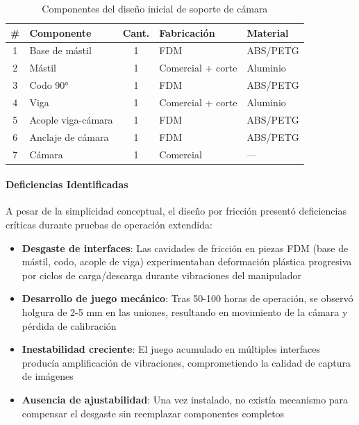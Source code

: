 \begin{table}[H]
\centering
\caption{Componentes del diseño inicial de soporte de cámara}
\label{tab:soporte_camara_v1}
\small
\begin{tabular}{|c|l|c|l|l|}
\hline
\textbf{\#} & \textbf{Componente} & \textbf{Cant.} & \textbf{Fabricación} & \textbf{Material} \\
\hline
1 & Base de mástil & 1 & FDM & ABS/PETG \\
2 & Mástil & 1 & Comercial + corte & Aluminio \\
3 & Codo 90° & 1 & FDM & ABS/PETG \\
4 & Viga & 1 & Comercial + corte & Aluminio \\
5 & Acople viga-cámara & 1 & FDM & ABS/PETG \\
6 & Anclaje de cámara & 1 & FDM & ABS/PETG \\
7 & Cámara & 1 & Comercial & --- \\
\hline
\end{tabular}
\end{table}

\paragraph{Deficiencias Identificadas}

A pesar de la simplicidad conceptual, el diseño por fricción presentó deficiencias críticas durante pruebas de operación extendida:

\begin{itemize}
    \item \textbf{Desgaste de interfaces}: Las cavidades de fricción en piezas FDM (base de mástil, codo, acople de viga) experimentaban deformación plástica progresiva por ciclos de carga/descarga durante vibraciones del manipulador
    
    \item \textbf{Desarrollo de juego mecánico}: Tras 50-100 horas de operación, se observó holgura de 2-5 mm en las uniones, resultando en movimiento de la cámara y pérdida de calibración
    
    \item \textbf{Inestabilidad creciente}: El juego acumulado en múltiples interfaces producía amplificación de vibraciones, comprometiendo la calidad de captura de imágenes
    
    \item \textbf{Ausencia de ajustabilidad}: Una vez instalado, no existía mecanismo para compensar el desgaste sin reemplazar componentes completos
\end{itemize}

